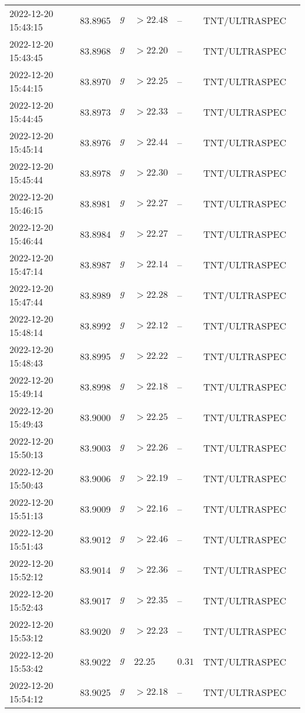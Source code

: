 \documentclass{nature_plusfigure}
\begin{document}
\begin{supplement}
\begin{center}
\begin{longtable}{lllllll}
2022-12-20 15:43:15 & 83.8965 & $g$ & $>22.48$ & -- & TNT/ULTRASPEC &  \\ 
2022-12-20 15:43:45 & 83.8968 & $g$ & $>22.20$ & -- & TNT/ULTRASPEC &  \\ 
2022-12-20 15:44:15 & 83.8970 & $g$ & $>22.25$ & -- & TNT/ULTRASPEC &  \\ 
2022-12-20 15:44:45 & 83.8973 & $g$ & $>22.33$ & -- & TNT/ULTRASPEC &  \\ 
2022-12-20 15:45:14 & 83.8976 & $g$ & $>22.44$ & -- & TNT/ULTRASPEC &  \\ 
2022-12-20 15:45:44 & 83.8978 & $g$ & $>22.30$ & -- & TNT/ULTRASPEC &  \\ 
2022-12-20 15:46:15 & 83.8981 & $g$ & $>22.27$ & -- & TNT/ULTRASPEC &  \\ 
2022-12-20 15:46:44 & 83.8984 & $g$ & $>22.27$ & -- & TNT/ULTRASPEC &  \\ 
2022-12-20 15:47:14 & 83.8987 & $g$ & $>22.14$ & -- & TNT/ULTRASPEC &  \\ 
2022-12-20 15:47:44 & 83.8989 & $g$ & $>22.28$ & -- & TNT/ULTRASPEC &  \\ 
2022-12-20 15:48:14 & 83.8992 & $g$ & $>22.12$ & -- & TNT/ULTRASPEC &  \\ 
2022-12-20 15:48:43 & 83.8995 & $g$ & $>22.22$ & -- & TNT/ULTRASPEC &  \\ 
2022-12-20 15:49:14 & 83.8998 & $g$ & $>22.18$ & -- & TNT/ULTRASPEC &  \\ 
2022-12-20 15:49:43 & 83.9000 & $g$ & $>22.25$ & -- & TNT/ULTRASPEC &  \\ 
2022-12-20 15:50:13 & 83.9003 & $g$ & $>22.26$ & -- & TNT/ULTRASPEC &  \\ 
2022-12-20 15:50:43 & 83.9006 & $g$ & $>22.19$ & -- & TNT/ULTRASPEC &  \\ 
2022-12-20 15:51:13 & 83.9009 & $g$ & $>22.16$ & -- & TNT/ULTRASPEC &  \\ 
2022-12-20 15:51:43 & 83.9012 & $g$ & $>22.46$ & -- & TNT/ULTRASPEC &  \\ 
2022-12-20 15:52:12 & 83.9014 & $g$ & $>22.36$ & -- & TNT/ULTRASPEC &  \\ 
2022-12-20 15:52:43 & 83.9017 & $g$ & $>22.35$ & -- & TNT/ULTRASPEC &  \\ 
2022-12-20 15:53:12 & 83.9020 & $g$ & $>22.23$ & -- & TNT/ULTRASPEC &  \\ 
2022-12-20 15:53:42 & 83.9022 & $g$ & $22.25$ & $0.31$ & TNT/ULTRASPEC &  \\ 
2022-12-20 15:54:12 & 83.9025 & $g$ & $>22.18$ & -- & TNT/ULTRASPEC &  \\ 

\end{longtable}
\end{center}
\end{supplement}
\end{document}
